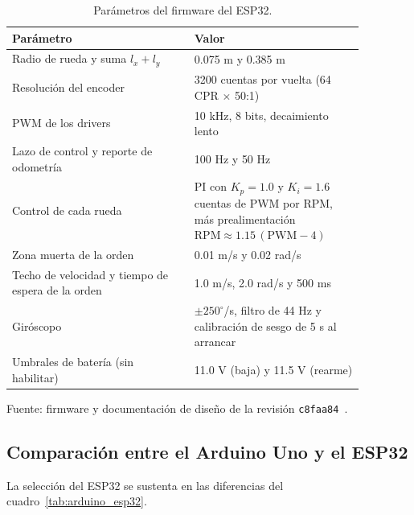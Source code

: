 \begin{table}[htbp]
\centering\small
\caption{Parámetros del firmware del ESP32.}\label{tab:parametros-firmware}
\begin{tabular}{p{0.45\linewidth}p{0.42\linewidth}}
\toprule
Parámetro & Valor\\\midrule
Radio de rueda y suma $l_x+l_y$ & 0.075 m y 0.385 m\\
Resolución del encoder & 3200 cuentas por vuelta (64 CPR $\times$ 50:1)\\
PWM de los drivers & 10 kHz, 8 bits, decaimiento lento\\
Lazo de control y reporte de odometría & 100 Hz y 50 Hz\\
Control de cada rueda & PI con $K_p=1.0$ y $K_i=1.6$ cuentas de PWM por RPM, más prealimentación $\mathrm{RPM}\approx1.15\,(\mathrm{PWM}-4)$\\
Zona muerta de la orden & 0.01 m/s y 0.02 rad/s\\
Techo de velocidad y tiempo de espera de la orden & 1.0 m/s, 2.0 rad/s y 500 ms\\
Giróscopo & $\pm250^{\circ}$/s, filtro de 44 Hz y calibración de sesgo de 5 s al arrancar\\
Umbrales de batería (sin habilitar) & 11.0 V (baja) y 11.5 V (rearme)\\
\bottomrule
\end{tabular}
\par\smallskip\small Fuente: firmware y documentación de diseño de la revisión \texttt{c8faa84}~\cite{repoMartha}.
\end{table}

\subsection{Comparación entre el Arduino Uno y el ESP32}

La selección del ESP32 se sustenta en las diferencias del cuadro~\ref{tab:arduino_esp32}.


